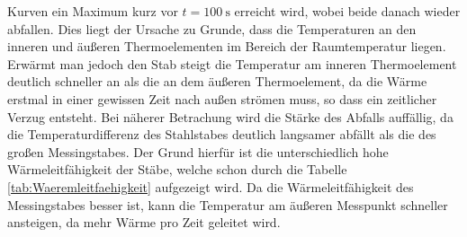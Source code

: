 Kurven ein Maximum kurz vor $t = \SI{100}{\second}$ erreicht wird, wobei beide danach 
wieder abfallen. Dies liegt der Ursache zu Grunde, dass die Temperaturen an den inneren und äußeren Thermoelementen im Bereich der Raumtemperatur liegen. 
Erwärmt man jedoch den Stab steigt die Temperatur am inneren  Thermoelement deutlich schneller an als die an dem äußeren Thermoelement, da die Wärme erstmal
in einer gewissen Zeit nach außen strömen muss, so dass ein zeitlicher Verzug entsteht. Bei näherer Betrachung wird die Stärke des Abfalls auffällig, da die
Temperaturdifferenz des Stahlstabes deutlich langsamer abfällt als die des großen Messingstabes. Der Grund hierfür ist die unterschiedlich hohe
Wärmeleitfähigkeit der Stäbe, welche schon durch die Tabelle \eqref{tab:Waeremleitfaehigkeit} aufgezeigt wird. Da die Wärmeleitfähigkeit des
Messingstabes besser ist, kann die Temperatur am äußeren Messpunkt schneller ansteigen, da mehr Wärme pro Zeit geleitet wird.
